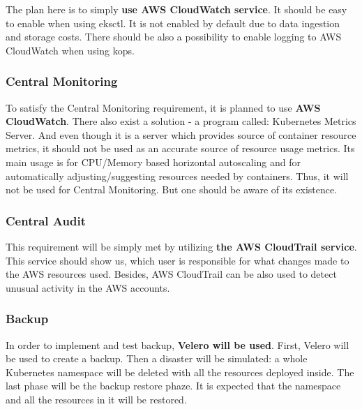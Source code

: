 The plan here is to simply \textbf{use AWS CloudWatch service}. It should be easy to enable when using eksctl. It is not enabled by default due to data ingestion and storage costs\cite{eksctl-cw}. There should be also a possibility to enable logging to AWS CloudWatch when using kops.

\subsubsection{Central Monitoring}

To satisfy the Central Monitoring requirement, it is planned to use \textbf{AWS CloudWatch}. There also exist a solution - a program called: Kubernetes Metrics Server. And even though it is a server which provides source of container resource metrics, it should not be used as an accurate source of resource usage metrics. Its main usage is for CPU/Memory based horizontal autoscaling and for automatically adjusting/suggesting resources needed by containers. Thus, it will not be used for Central Monitoring. But one should be aware of its existence\cite{k8s-metrics-server}.


\subsubsection{Central Audit}

This requirement will be simply met by utilizing \textbf{the AWS CloudTrail service}. This service should show us, which user is responsible for what changes made to the AWS resources used. Besides, AWS CloudTrail can be also used to detect unusual activity in the AWS accounts\cite{online-ct}.

\subsubsection{Backup}

In order to implement and test backup, \textbf{Velero will be used}. First, Velero will be used to create a backup. Then a disaster will be simulated: a whole Kubernetes namespace will be deleted with all the resources deployed inside. The last phase will be the backup restore phaze. It is expected that the namespace and all the resources in it will be restored\cite{eksworkshop-backup}\cite{velero-examples}.

